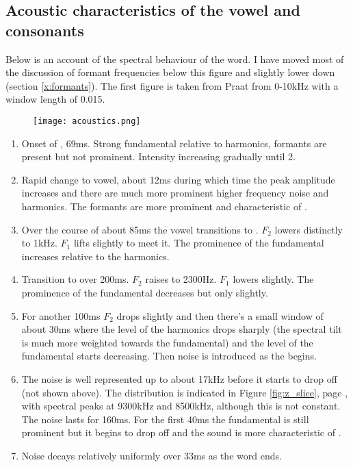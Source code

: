 \subsection{Acoustic characteristics of the vowel and consonants}

Below is an account of the spectral behaviour of the word. I have moved most of the discussion of formant frequencies below this figure and slightly lower down (section \ref{x:formants}). The first figure is taken from Praat from 0-10kHz with a window length of 0.015.

\begin{figure}[H] 
	\texttt{[image: acoustics.png]}
\end{figure}

\begin{enumerate}
	\item Onset of , 69ms. Strong fundamental relative to harmonics, formants are present but not prominent. Intensity increasing gradually until 2.
	\item Rapid change to vowel, about 12ms during which time the peak amplitude increases and there are much more prominent higher frequency noise and harmonics. The formants are more prominent and characteristic of .
	\item Over the course of about 85ms the vowel transitions to . $F_2$ lowers distinctly to 1kHz. $F_1$ lifts slightly to meet it. The prominence of the fundamental increases relative to the harmonics.
	\item Transition to  over 200ms. $F_2$ raises to 2300Hz. $F_1$ lowers slightly. The prominence of the fundamental decreases but only slightly.
	\item For another 100ms $F_2$ drops slightly and then there's a small window of about 30ms where the level of the harmonics drops sharply (the spectral tilt is much more weighted towards the fundamental) and the level of the fundamental starts decreasing. Then noise is introduced as the  begins.
	\item The noise is well represented up to about 17kHz before it starts to drop off (not shown above). The distribution is indicated in Figure \ref{fig:z_slice}, page \pageref{fig:z_slice}, with spectral peaks at 9300kHz and 8500kHz, although this is not constant. The noise lasts for 160ms. For the first 40ms the fundamental is still prominent but it begins to drop off and the sound is more characteristic of .
	\item Noise decays relatively uniformly over 33ms as the word ends.
\end{enumerate}

